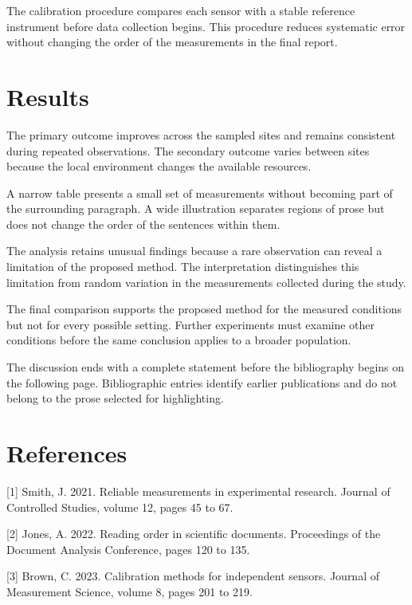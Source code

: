 \documentclass[10pt,twocolumn]{article}
\begin{document}
The calibration procedure compares each sensor with a stable reference instrument before data collection begins. This procedure reduces systematic error without changing the order of the measurements in the final report.


\section{Results}
The primary outcome improves across the sampled sites and remains consistent during repeated observations. The secondary outcome varies between sites because the local environment changes the available resources.


A narrow table presents a small set of measurements without becoming part of the surrounding paragraph. A wide illustration separates regions of prose but does not change the order of the sentences within them.


The analysis retains unusual findings because a rare observation can reveal a limitation of the proposed method. The interpretation distinguishes this limitation from random variation in the measurements collected during the study.


The final comparison supports the proposed method for the measured conditions but not for every possible setting. Further experiments must examine other conditions before the same conclusion applies to a broader population.


The discussion ends with a complete statement before the bibliography begins on the following page. Bibliographic entries identify earlier publications and do not belong to the prose selected for highlighting.


\clearpage
\nolinenumbers
\section*{References}
[1] Smith, J. 2021. Reliable measurements in experimental research. Journal of Controlled Studies, volume 12, pages 45 to 67.

[2] Jones, A. 2022. Reading order in scientific documents. Proceedings of the Document Analysis Conference, pages 120 to 135.

[3] Brown, C. 2023. Calibration methods for independent sensors. Journal of Measurement Science, volume 8, pages 201 to 219.
\end{document}
